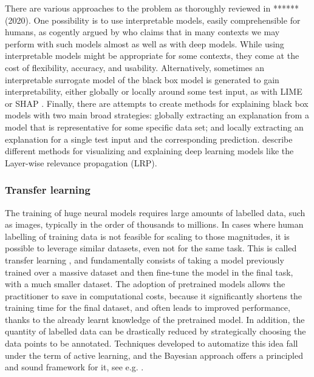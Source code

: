 There are various approaches to the problem as 
thoroughly reviewed in ****** (2020).
One possibility is to use interpretable models,
 easily comprehensible for humans,
as cogently argued by \parencite{rudin2019stop} who claims 
that in many contexts we may perform with such models 
almost as well as with deep models.
 While using interpretable models might be appropriate for some
  contexts, they come at the cost of flexibility, accuracy, and usability.
  Alternatively, sometimes an interpretable surrogate model of the black box model is generated to gain interpretability, either globally or locally around
some test input, as with LIME \parencite{ribeiro2016model} or SHAP \parencite{lundberg2017unified}.
Finally, there are attempts to create methods for explaining 
black box models with two main broad strategies: globally
extracting an explanation from a model that is representative for some specific
data set; and locally extracting an explanation for a single test input 
 and the corresponding prediction.
  \parencite{samek2017explainable} describe different methods for visualizing and explaining deep learning models like the Layer-wise relevance propagation (LRP). 
 
 
\subsubsection{Transfer learning}\label{sec:transfer}

The training of huge neural models requires large amounts of labelled data, such as images, typically in the order of thousands to millions. In cases where human labelling of training data is not feasible 
for scaling to those magnitudes, it is possible to leverage similar datasets, even not for the same task. This is called transfer learning \parencite{tan2018survey,pan2009survey}, and fundamentally consists of taking a model previously trained over a massive dataset and then fine-tune the model in the final task, with a much smaller dataset. The adoption of pretrained models allows the practitioner to save in computational costs, because it significantly shortens the training time for the final dataset, and often leads to improved performance, thanks to the already learnt knowledge of the pretrained model. In addition, the quantity of labelled data can be drastically reduced by strategically choosing the data points to be annotated. Techniques developed to automatize this idea fall under the term of active learning, and the Bayesian approach offers a principled and sound framework for it, see e.g. \parencite{houlsby2011bayesian}.

